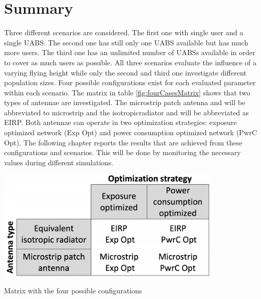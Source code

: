 \section{Summary}
Three different scenarios are considered. The first one with single user and a single \gls{UABS}. The second one has 
still only one \gls{UABS} available but has much more users. The third one has an unlimited number of \gls{UABS}s 
available in order to cover as much users as possible.
All three scenarios evaluate the influence of a varying flying height while only the second and third one 
investigate different population sizes.
Four possible configurations exist for each evaluated parameter within each scenario.
The matrix in table \ref{fig:fourCasesMatrix} shows that two types of antennae are investigated.
The microstrip patch antenna and will be abbreviated to microstrip and the \gls{isotropicradiator}
and will be abbreviated as \acs{EIRP}. Both antennae can operate in two 
optimization
strategies: exposure optimized network (\gls{Exp Opt}) and power consumption optimized network (\gls{PwrC Opt}). 
The following chapter reports the results that are achieved from these configurations and scenarios. This will be done by 
monitoring the necessary values during different simulations.

\begin{table}[h!]
\centering
  \includegraphics[width=0.8\textwidth]{../images/fourCasesMatrix.png}
  \caption{Matrix with the four possible configurations}
  \label{fig:fourCasesMatrix}
\end{table}




